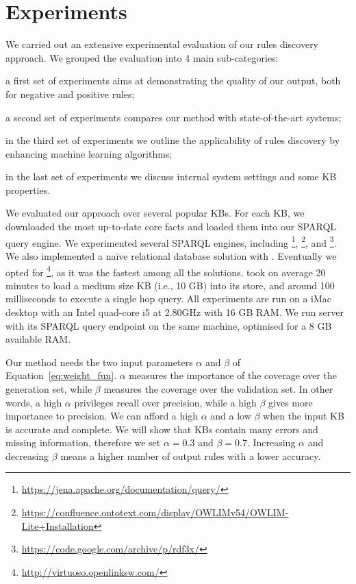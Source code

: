 \section{Experiments} \label{sec:krd_experiments}
We carried out an extensive experimental evaluation of our rules discovery approach.
We grouped the evaluation into 4 main sub-categories: 
\begin{inparaenum}[\itshape(i)]
	\item a first set of experiments aims at demonstrating the quality of our output, both for negative and positive rules;
	\item a second set of experiments compares our method with state-of-the-art systems;
	\item in the third set of experiments we outline the applicability of rules discovery by enhancing machine learning algorithms;
	\item in the last set of experiments we discuss internal system settings and some KB properties.
\end{inparaenum}

We evaluated our approach over several popular KBs. For each KB, we downloaded the most up-to-date core facts and loaded them into our SPARQL query engine. We experimented several SPARQL engines, including \footnote{\url{https://jena.apache.org/documentation/query/}}, \footnote{\url{https://confluence.ontotext.com/display/OWLIMv54/OWLIM-Lite+Installation}}, and \footnote{\url{https://code.google.com/archive/p/rdf3x/}}. We also implemented a na\"ive relational database solution with . Eventually we opted for \footnote{\url{http://virtuoso.openlinksw.com/}}, as it was the fastest among all the solutions.  took on average 20 minutes to load a medium size KB (i.e., 10 GB) into its store, and around 100 milliseconds to execute a single hop query. All experiments are run on a iMac desktop with
an Intel quad-core i5 at 2.80GHz with 16 GB RAM. We run  server with its SPARQL query endpoint on the same machine, optimised for a 8 GB available RAM.

Our method needs the two input parameters $\alpha$ and $\beta$ of Equation~\ref{eq:weight_fun}. $\alpha$ measures the importance of the coverage over the generation set, while $\beta$ measures the coverage over the validation set. In other words, a high $\alpha$ privileges recall over precision, while a high $\beta$ gives more importance to precision. We can afford a high $\alpha$ and a low $\beta$ when the input KB is accurate and complete. We will show that KBs contain many errors and missing information, therefore we set $\alpha = 0.3$ and $\beta = 0.7$. Increasing $\alpha$ and decreasing $\beta$ means a higher number of output rules with a lower accuracy. 

